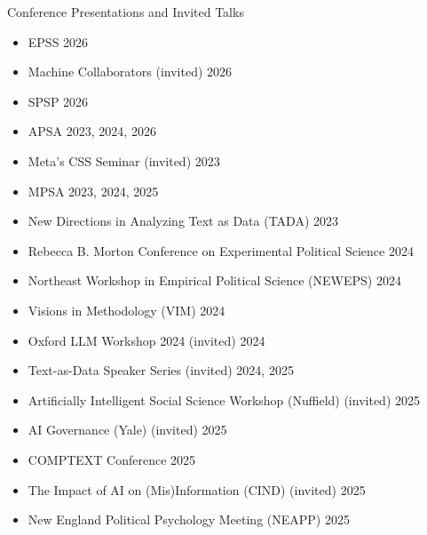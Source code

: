 \documentclass{resume} %
\begin{document}
	\begin{rSection}{Conference Presentations and Invited Talks}
		\bigskip
		\begin{itemize}
			\item EPSS \hfill 2026
			\item Machine Collaborators (invited) \hfill 2026
			\item SPSP \hfill 2026
			\item APSA \hfill 2023, 2024, 2026
			\item Meta's CSS Seminar (invited) \hfill 2023
			\item MPSA \hfill 2023, 2024, 2025
			\item New Directions in Analyzing Text as Data (TADA) \hfill 2023
			\item Rebecca B. Morton Conference on Experimental Political Science \hfill 2024
			\item Northeast Workshop in Empirical Political Science (NEWEPS) \hfill 2024
			\item Visions in Methodology (VIM) \hfill 2024
			\item Oxford LLM Workshop 2024 (invited) \hfill 2024
			\item Text-as-Data Speaker Series (invited) \hfill 2024, 2025
			\item Artificially Intelligent Social Science Workshop (Nuffield) (invited) \hfill 2025
			\item AI Governance (Yale) (invited) \hfill 2025
			\item COMPTEXT Conference \hfill 2025
			\item The Impact of AI on (Mis)Information (CIND) (invited) \hfill 2025
			\item  New England Political Psychology Meeting (NEAPP) \hfill 2025
		\end{itemize}
		
	\end{rSection}
	
\end{document}
